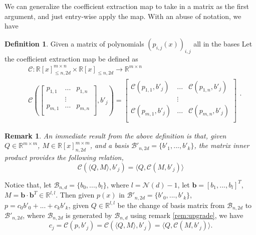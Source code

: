 \documentclass[12pt]{amsart}
\numberwithin{equation}{section}
\newtheorem{remark}[thm]{Remark}
\theoremstyle{definition}
\newtheorem{definition}[thm]{Definition}
\numberwithin{thm}{section}
\begin{document}
\smallskip 
We can generalize the {coefficient extraction map} to take in a matrix as the first argument, and just entry-wise apply the map. With an abuse of notation, we have 
\begin{definition}
     Given a matrix of polynomials $(p_{i, j}(x))_{i, j}$ all in the bases Let the {coefficient extraction map} be defined as 
     \begin{equation*}
          \begin{split}
               & \mathcal{C}: \mathbb{R}[x]_{\leq n, 2d}^{m \times n} \times \mathbb{R}[x]_{\leq n, 2d} \rightarrow \mathbb{R}^{m \times n} \\
               & \mathcal{C}(
                    \begin{bmatrix} 
                         p_{1, 1} & ... & p_{1, n} \\
                         & \vdots \\
                         p_{m, 1} & ... & p_{m, n} \\
                    \end{bmatrix}, b'_j
               ) = \begin{bmatrix} 
                    \mathcal{C}(p_{1, 1}, b'_j) & ... &  \mathcal{C}(p_{1, n}, b'_j) \\
                    & \vdots \\
                    \mathcal{C}(p_{m, 1}, b'_j) & ... &  \mathcal{C}(p_{m, n}, b'_j) \\
                    \end{bmatrix}
          \end{split}.
     \end{equation*}
\end{definition}

\begin{remark}
     An immediate result from the above definition is that, given $Q \in \mathbb{R}^{m \times m}$, $M \in \mathbb{R}[x]_{n, 2d}^{m \times m}$, 
     and a basis $\mathcal{B}'_{n, 2d} = \{b'_1, ..., b'_k\}$, the matrix inner product provides the following relation,
     \begin{equation*}
          \mathcal{C}(\langle Q, M \rangle, b'_j) = \langle Q, \mathcal{C}(M, b'_j) \rangle
     \end{equation*}
\end{remark}

\smallskip
Notice that, let $\mathcal{B}_{n, d} = \{b_0,...,b_l\}$, where $l = \mathcal{N}(d) - 1$, 
let $\mathbf{b} = [b_1, ..., b_l]^T$, $M = \mathbf{b} \cdot \mathbf{b}^T \in \mathbb{R}^{l, l}$. 
Then given $p(x)$ in $\mathcal{B}'_{n, 2d} = \{b'_0, ..., b'_k\}$, $p = c_0b'_0 + ... + c_k b'_k$, 
given $Q \in \mathbb{R}^{l, l}$ be the change of basis matrix from $\mathcal{B}_{n, 2d}$ to $\mathcal{B}'_{n, 2d}$, 
where $\mathcal{B}_{n, 2d}$ is generated by $\mathcal{B}_{n, d}$ using remark \ref{rem:upgrade}, we have
\begin{equation}
     c_j = \mathcal{C}(p, b'_j) = \mathcal{C}(\langle Q, M \rangle, b'_j ) = \langle Q, \mathcal{C}(M, b'_j) \rangle.
\end{equation}
\end{document}
